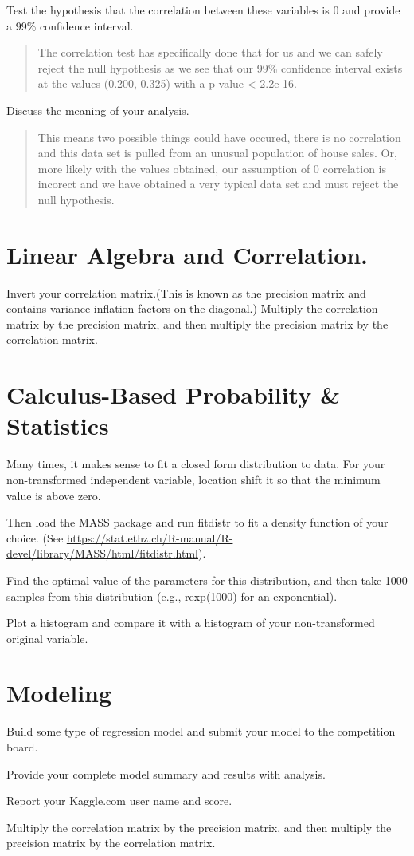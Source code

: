 \documentclass[]{article}
\begin{document}
Test the hypothesis that the correlation between these variables is 0
and provide a 99\% confidence interval.

\begin{quote}
The correlation test has specifically done that for us and we can safely
reject the null hypothesis as we see that our 99\% confidence interval
exists at the values (0.200, 0.325) with a p-value \textless{} 2.2e-16.
\end{quote}

Discuss the meaning of your analysis.

\begin{quote}
This means two possible things could have occured, there is no
correlation and this data set is pulled from an unusual population of
house sales. Or, more likely with the values obtained, our assumption of
0 correlation is incorect and we have obtained a very typical data set
and must reject the null hypothesis.
\end{quote}

\section{Linear Algebra and
Correlation.}\label{linear-algebra-and-correlation.}

Invert your correlation matrix.(This is known as the precision matrix
and contains variance inflation factors on the diagonal.) Multiply the
correlation matrix by the precision matrix, and then multiply the
precision matrix by the correlation matrix.

\section{Calculus-Based Probability \&
Statistics}\label{calculus-based-probability-statistics}

Many times, it makes sense to fit a closed form distribution to data.
For your non-transformed independent variable, location shift it so that
the minimum value is above zero.

Then load the MASS package and run fitdistr to fit a density function of
your choice. (See
\url{https://stat.ethz.ch/R-manual/R-devel/library/MASS/html/fitdistr.html}).

Find the optimal value of the parameters for this distribution, and then
take 1000 samples from this distribution (e.g., rexp(1000) for an
exponential).

Plot a histogram and compare it with a histogram of your non-transformed
original variable.

\section{Modeling}\label{modeling}

Build some type of regression model and submit your model to the
competition board.

Provide your complete model summary and results with analysis.

Report your Kaggle.com user name and score.

Multiply the correlation matrix by the precision matrix, and then
multiply the precision matrix by the correlation matrix.
\end{document}
